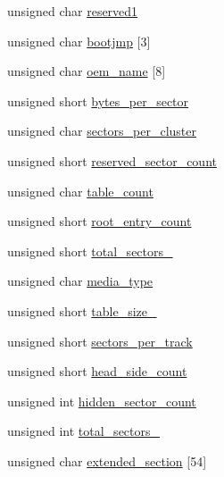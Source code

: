 \begin{DoxyCompactItemize}
\item 
unsigned char \hyperlink{a00158_affe215a7220b2d52fb9dacf3b35e56dc_affe215a7220b2d52fb9dacf3b35e56dc}{reserved1}
\item 
unsigned char \hyperlink{a00158_a9d09d7d5af910f75a499a71fc8db1cb1_a9d09d7d5af910f75a499a71fc8db1cb1}{bootjmp} \mbox{[}3\mbox{]}
\item 
unsigned char \hyperlink{a00158_aad08c3f8e8a444d492cc77be16a79d86_aad08c3f8e8a444d492cc77be16a79d86}{oem\+\_\+name} \mbox{[}8\mbox{]}
\item 
unsigned short \hyperlink{a00158_a383840c631d2e9d53e46b6bc5d17c3eb_a383840c631d2e9d53e46b6bc5d17c3eb}{bytes\+\_\+per\+\_\+sector}
\item 
unsigned char \hyperlink{a00158_a78e26c23d518983e13881d4e0e53356a_a78e26c23d518983e13881d4e0e53356a}{sectors\+\_\+per\+\_\+cluster}
\item 
unsigned short \hyperlink{a00158_af819ceb3bec79135b7de34a0b973f085_af819ceb3bec79135b7de34a0b973f085}{reserved\+\_\+sector\+\_\+count}
\item 
unsigned char \hyperlink{a00158_afc6604c21ae7038b249589ecd0560622_afc6604c21ae7038b249589ecd0560622}{table\+\_\+count}
\item 
unsigned short \hyperlink{a00158_a7d8c3eb5a95ebc9f53ef60d1e802e8a8_a7d8c3eb5a95ebc9f53ef60d1e802e8a8}{root\+\_\+entry\+\_\+count}
\item 
unsigned short \hyperlink{a00158_ab6c9ebaa0ea252eb5692e3d7dc426f46_ab6c9ebaa0ea252eb5692e3d7dc426f46}{total\+\_\+sectors\+\_}
\item 
unsigned char \hyperlink{a00158_ab90dc4a72adfaa3c57712df0dab86154_ab90dc4a72adfaa3c57712df0dab86154}{media\+\_\+type}
\item 
unsigned short \hyperlink{a00158_ade6f19059c505e2818913816bd8392b3_ade6f19059c505e2818913816bd8392b3}{table\+\_\+size\+\_}
\item 
unsigned short \hyperlink{a00158_a602ee4dea0c5142e60ebabb37adf3dd9_a602ee4dea0c5142e60ebabb37adf3dd9}{sectors\+\_\+per\+\_\+track}
\item 
unsigned short \hyperlink{a00158_a33263a0ce9b20cca4a493c961a5ade52_a33263a0ce9b20cca4a493c961a5ade52}{head\+\_\+side\+\_\+count}
\item 
unsigned int \hyperlink{a00158_a0c59c66983eef3ab335aed301b09c3ba_a0c59c66983eef3ab335aed301b09c3ba}{hidden\+\_\+sector\+\_\+count}
\item 
unsigned int \hyperlink{a00158_a0eb25939eb0c1c4ff72bfec5677e78c2_a0eb25939eb0c1c4ff72bfec5677e78c2}{total\+\_\+sectors\+\_}
\item 
unsigned char \hyperlink{a00158_aac6b462ea9420b07d31ee647d2fb5a21_aac6b462ea9420b07d31ee647d2fb5a21}{extended\+\_\+section} \mbox{[}54\mbox{]}
\end{DoxyCompactItemize}


